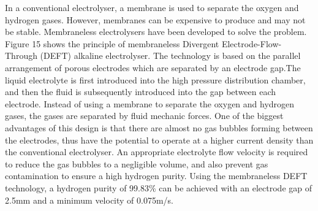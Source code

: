 In a conventional electrolyser, a membrane is used to separate the oxygen and hydrogen gases. However, membranes can be expensive to produce and may not be stable. Membraneless electrolysers have been developed to solve the problem. Figure 15 shows the principle of membraneless Divergent Electrode-Flow-Through (DEFT) alkaline electrolyser. The technology is based on the parallel arrangement of porous electrodes which are separated by an electrode gap.The liquid electrolyte is first introduced into the high pressure distribution chamber, and then the fluid is subsequently introduced into the gap between each electrode. Instead of using a membrane to separate the oxygen and hydrogen gases, the gases are separated by fluid mechanic forces.\cite{membraneless2} One of the biggest advantages of this design is that there are almost no gas bubbles forming between the electrodes, thus have the potential to operate at a higher current density than the conventional electrolyser. An appropriate electrolyte flow velocity is required to reduce the gas bubbles to a negligible volume, and also prevent gas contamination to ensure a high hydrogen purity. Using the membraneless DEFT technology, a hydrogen purity of 99.83\% can be achieved with an electrode gap of 2.5mm and a minimum velocity of 0.075m/s.



